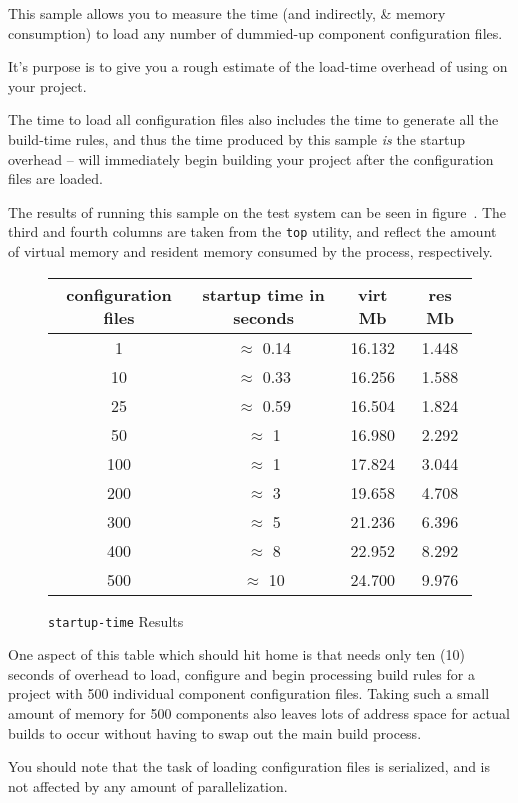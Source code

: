 This sample allows you to measure the time (and indirectly, \lmsbw \&
\make memory consumption) to load any number of dummied-up component
configuration files.

It's purpose is to give you a rough estimate of the load-time overhead
of using \lmsbw on your project.

The time to load all configuration files also includes the time to
generate all the build-time \make rules, and thus the time produced by
this sample \emph{is} the startup overhead -- \make will immediately
begin building your project after the configuration files are loaded.

The results of running this sample on the test system can be seen in
figure~.  The third and fourth
columns are taken from the \texttt{top} utility, and reflect the
amount of virtual memory and resident memory consumed by the process,
respectively.

\begin{figure}[tb]
  \begin{center}
    \begin{tabular}{|c|c|c|c|}
      \hline configuration files  & startup time in seconds & virt Mb & res Mb \\
      \hline   1 & $\approx$ 0.14  & 16.132 & 1.448 \\
      \hline  10 & $\approx$ 0.33  & 16.256 & 1.588 \\
      \hline  25 & $\approx$ 0.59  & 16.504 & 1.824 \\
      \hline  50 & $\approx$ 1  & 16.980 & 2.292 \\
      \hline 100 & $\approx$ 1  & 17.824 & 3.044 \\
      \hline 200 & $\approx$ 3  & 19.658 & 4.708 \\
      \hline 300 & $\approx$ 5  & 21.236 & 6.396 \\
      \hline 400 & $\approx$ 8  & 22.952 & 8.292 \\
      \hline 500 & $\approx$ 10 & 24.700 & 9.976 \\
      \hline
    \end{tabular}
  \end{center}
\caption{\texttt{startup-time} Results}\label{samples:startup-time-results}
\end{figure}

One aspect of this table which should hit home is that \lmsbw needs
only ten (10) seconds of overhead to load, configure and begin
processing build rules for a project with 500 individual component
configuration files.  Taking such a small amount of memory for 500
components also leaves lots of address space for actual builds to
occur without having to swap out the main build process.

You should note that the task of loading configuration files is
serialized, and is not affected by any amount of parallelization.

